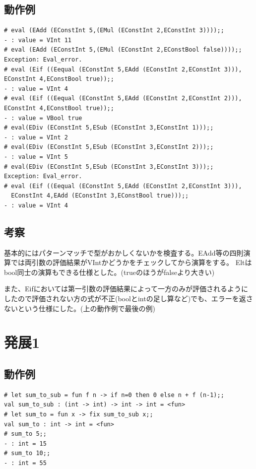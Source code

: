 \documentclass[11pt,a4paper]{jsarticle}
\begin{document}
\subsection*{動作例}
\begin{lstlisting}[basicstyle=\ttfamily\footnotesize, frame=single]
# eval (EAdd (EConstInt 5,(EMul (EConstInt 2,EConstInt 3))));;
- : value = VInt 11
# eval (EAdd (EConstInt 5,(EMul (EConstInt 2,EConstBool false))));;
Exception: Eval_error.
# eval (Eif ((Eequal (EConstInt 5,EAdd (EConstInt 2,EConstInt 3))),
EConstInt 4,EConstBool true));;
- : value = VInt 4
# eval (Eif ((Eequal (EConstInt 5,EAdd (EConstInt 2,EConstInt 2))),
EConstInt 4,EConstBool true));;
- : value = VBool true
# eval(EDiv (EConstInt 5,ESub (EConstInt 3,EConstInt 1)));;
- : value = VInt 2
# eval(EDiv (EConstInt 5,ESub (EConstInt 3,EConstInt 2)));;
- : value = VInt 5
# eval(EDiv (EConstInt 5,ESub (EConstInt 3,EConstInt 3)));;
Exception: Eval_error.
# eval (Eif ((Eequal (EConstInt 5,EAdd (EConstInt 2,EConstInt 3))),
  EConstInt 4,EAdd (EConstInt 3,EConstBool true)));;
- : value = VInt 4
\end{lstlisting}
\subsection*{考察}
基本的にはパターンマッチで型がおかしくないかを検査する。EAdd等の四則演算では両引数の評価結果がVIntかどうかをチェックしてから演算をする。
Eltはbool同士の演算もできる仕様とした。(trueのほうがfalseより大きい)\par
また、Eifにおいては第一引数の評価結果によって一方のみが評価されるようにしたので評価されない方の式が不正(boolとintの足し算など)でも、エラーを返さないという仕様にした。(上の動作例で最後の例)
\section*{発展1}
\subsection*{動作例}
\begin{lstlisting}[basicstyle=\ttfamily\footnotesize, frame=single]
# let sum_to_sub = fun f n -> if n=0 then 0 else n + f (n-1);;
val sum_to_sub : (int -> int) -> int -> int = <fun>
# let sum_to = fun x -> fix sum_to_sub x;;
val sum_to : int -> int = <fun>
# sum_to 5;;
- : int = 15
# sum_to 10;;
- : int = 55
\end{lstlisting}
\end{document}
